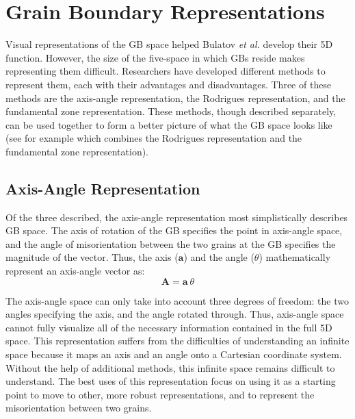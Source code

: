 \documentclass[twoside,senior]{BYUPhys}
\begin{document}
\chapter{Grain Boundary Representations\label{app:gbRep}}
Visual representations of the GB space helped Bulatov \emph{et al.} develop their 5D function.  However, the size of the five-space in which GBs reside makes representing them difficult.  Researchers have developed different methods to represent them, each with their advantages and disadvantages.  Three of these methods are the axis-angle representation, the Rodrigues representation, and the fundamental zone representation.  These methods, though described separately, can be used together to form a better picture of what the GB space looks like (see for example  which combines the Rodrigues representation and the fundamental zone representation).

\section{Axis-Angle Representation\label{GBReps:AA}}
Of the three described, the axis-angle representation most simplistically describes GB space.  The axis of rotation of the GB specifies the point in axis-angle space, and the angle of misorientation between the two grains at the GB specifies the magnitude of the vector.  Thus, the axis ($\bm{a}$) and the angle ($\theta$) mathematically represent an axis-angle vector as:
\begin{equation}
\bm{A} = \bm{a}\ \theta
\label{eq:aaVec}
\end{equation} 

The axis-angle space can only take into account three degrees of freedom: the two angles specifying the axis, and the angle rotated through.  Thus, axis-angle space cannot fully visualize all of the necessary information contained in the full 5D space.\cite{frank1988} This representation suffers from the difficulties of understanding an infinite space because it maps an axis and an angle onto a Cartesian coordinate system.  Without the help of additional methods, this infinite space remains difficult to understand.  The best uses of this representation focus on using it as a starting point to move to other, more robust representations, and to represent the misorientation between two grains.\cite{randle2000}
\end{document}
